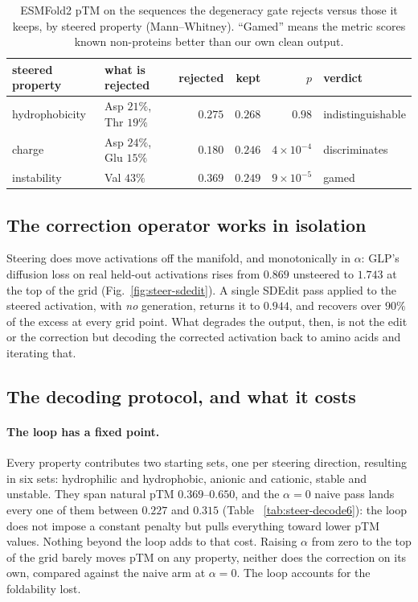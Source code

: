 \documentclass{article}
\begin{document}
\begin{table}[htbp]
\centering
\caption{ESMFold2 pTM on the sequences the degeneracy gate rejects versus those it keeps,
by steered property (Mann--Whitney). ``Gamed'' means the metric scores known non-proteins
better than our own clean output.}
\label{tab:steer-gate}
\begin{tabular}{llrrrl}
\toprule
steered property & what is rejected & rejected & kept & $p$ & verdict \\
\midrule
hydrophobicity & Asp $21\%$, Thr $19\%$ & $0.275$ & $0.268$ & $0.98$ & indistinguishable \\
charge         & Asp $24\%$, Glu $15\%$ & $0.180$ & $0.246$ & $4{\times}10^{-4}$ & discriminates \\
instability    & Val $43\%$             & $0.369$ & $0.249$ & $9{\times}10^{-5}$ & gamed \\
\bottomrule
\end{tabular}
\end{table}

\fi

\subsection{The correction operator works in isolation}
\label{app:steer-sdedit}

Steering does move activations off the manifold, and monotonically in $\alpha$: GLP's diffusion
loss on real held-out activations rises from $0.869$ unsteered to $1.743$ at the top of the grid
(Fig.~\ref{fig:steer-sdedit}). A single SDEdit pass applied to the steered activation, with
\emph{no} generation, returns it to $0.944$, and recovers over $90\%$ of the excess at every
grid point. What degrades the output, then, is not the edit or the correction but decoding the
corrected activation back to amino acids and iterating that.


\subsection{The decoding protocol, and what it costs}
\label{app:steer-protocol}

\paragraph{The loop has a fixed point.}  Every property contributes two starting sets, one per
steering direction, resulting in six sets: hydrophilic and hydrophobic, anionic and cationic, stable
and unstable. They span natural pTM $0.369$--$0.650$, and the $\alpha{=}0$ naive pass lands every
one of them between $0.227$ and $0.315$ (Table ~\ref{tab:steer-decode6}): the loop does not impose a constant penalty but pulls
everything toward lower pTM values. Nothing beyond the loop adds to that cost. Raising $\alpha$ from zero to the top of the grid barely
moves pTM on any property, neither does the correction on its own, compared against
the naive arm at $\alpha{=}0$. The loop accounts for the foldability lost.
\end{document}
